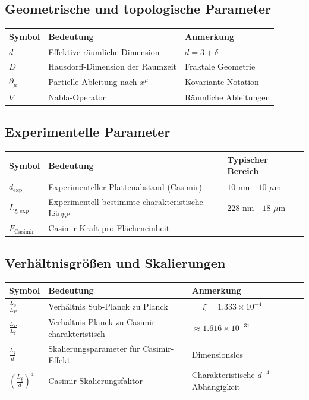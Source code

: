 	\subsection{Geometrische und topologische Parameter}
	\begin{longtable}{>{\raggedright\arraybackslash}p{1.5cm} >{\raggedright\arraybackslash}p{6.5cm} >{\raggedright\arraybackslash}p{2.5cm}}
		\toprule
		\textbf{Symbol} & \textbf{Bedeutung} & \textbf{Anmerkung} \\
		\midrule
		$d$ & Effektive räumliche Dimension & $d = 3 + \delta$ \\
		$D$ & Hausdorff-Dimension der Raumzeit & Fraktale Geometrie \\
		$\partial_\mu$ & Partielle Ableitung nach $x^\mu$ & Kovariante Notation \\
		$\nabla$ & Nabla-Operator & Räumliche Ableitungen \\
		\bottomrule
	\end{longtable}
	
	\subsection{Experimentelle Parameter}
	\begin{longtable}{>{\raggedright\arraybackslash}p{1.5cm} >{\raggedright\arraybackslash}p{6.5cm} >{\raggedright\arraybackslash}p{2.5cm}}
		\toprule
		\textbf{Symbol} & \textbf{Bedeutung} & \textbf{Typischer Bereich} \\
		\midrule
		$d_{\text{exp}}$ & Experimenteller Plattenabstand (Casimir) & $10$ nm - $10$ $\mu$m \\
		$L_{\xi,\text{exp}}$ & Experimentell bestimmte charakteristische Länge & $228$ nm - $18$ $\mu$m \\
		$F_{\text{Casimir}}$ & Casimir-Kraft pro Flächeneinheit & [N/m$^2$] \\
		\bottomrule
	\end{longtable}
	
	\subsection{Verhältnisgrößen und Skalierungen}
	\begin{longtable}{>{\raggedright\arraybackslash}p{1.5cm} >{\raggedright\arraybackslash}p{6.5cm} >{\raggedright\arraybackslash}p{2.5cm}}
		\toprule
		\textbf{Symbol} & \textbf{Bedeutung} & \textbf{Anmerkung} \\
		\midrule
		$\frac{L_0}{L_P}$ & Verhältnis Sub-Planck zu Planck & $= \xi = 1.333 \times 10^{-4}$ \\
		$\frac{L_P}{L_\xi}$ & Verhältnis Planck zu Casimir-charakteristisch & $\approx 1.616 \times 10^{-31}$ \\
		$\frac{L_\xi}{d}$ & Skalierungsparameter für Casimir-Effekt & Dimensionslos \\
		$\left(\frac{L_\xi}{d}\right)^4$ & Casimir-Skalierungsfaktor & Charakteristische $d^{-4}$-Abhängigkeit \\
		\bottomrule
	\end{longtable}
	
